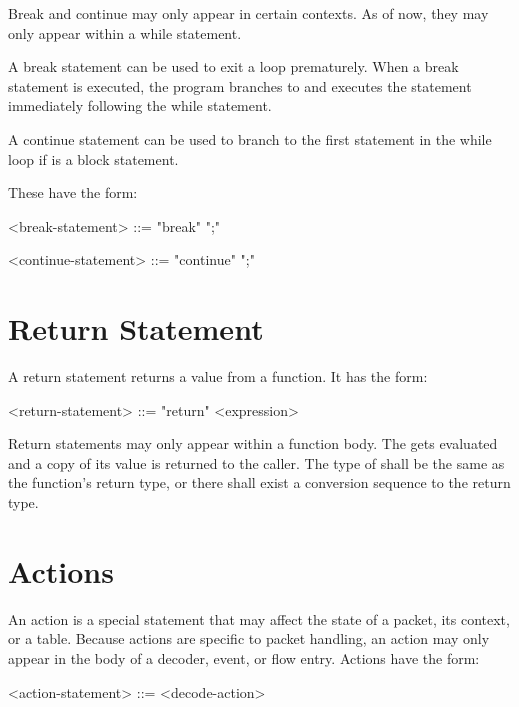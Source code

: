 Break and continue may only appear in certain contexts. As of now, they may only appear within a while statement.

A break statement can be used to exit a loop prematurely. When a break statement is executed, the program branches to and executes the statement immediately following the while statement.

A continue statement can be used to branch to the first statement in the while loop if  is a block statement. 

These have the form:

\begin{minip}
\begin{grammar}
<break-statement> ::= "break" ";"

<continue-statement> ::= "continue" ";"
\end{grammar}
\end{minip}

\section{Return Statement} \label{guide:return_stmt}

A return statement returns a value from a function. It has the form:

\begin{minip}
\begin{grammar}
<return-statement> ::= "return" <expression>
\end{grammar}
\end{minip}

Return statements may only appear within a function body. The  gets evaluated and a copy of its value is returned to the caller. The type of  shall be the same as the function's return type, or there shall exist a conversion sequence to the return type.

\section{Actions} \label{guide:action}

An action is a special statement that may affect the state of a packet, its context, or a table. Because actions are specific to packet handling, an action may only appear in the body of a decoder, event, or flow entry. Actions have the form:

\begin{minip}
\begin{grammar}
<action-statement> ::=
<decode-action>
\end{grammar}
\end{minip}


